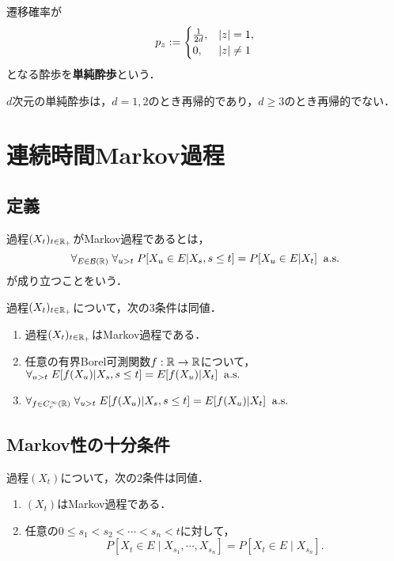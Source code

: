 \documentclass[uplatex,dvipdfmx]{jsreport}
\begin{document}
\begin{definition}
    遷移確率が
    \[p_z:=\begin{cases}
        \frac{1}{2d},&\lvert z\rvert=1,\\
        0,&\lvert z\rvert\ne1
    \end{cases}\]
    となる酔歩を\textbf{単純酔歩}という．
\end{definition}

\begin{theorem}[Polya]
    $d$次元の単純酔歩は，$d=1,2$のとき再帰的であり，$d\ge3$のとき再帰的でない．
\end{theorem}



\section{連続時間Markov過程}

\subsection{定義}

\begin{definition}
    過程$(X_t)_{t\in\mathbb{R}_+}$がMarkov過程であるとは，
    \[\forall_{E\in\mathcal{B}(\mathbb{R})}\;\forall_{u>t}\;P[X_u\in E|X_s,s\le t]=P[X_u\in E|X_t]\;\;\mathrm{a.s.}\]
    が成り立つことをいう．
\end{definition}

\begin{lemma}
    過程$(X_t)_{t\in\mathbb{R}_+}$について，次の3条件は同値．
    \begin{enumerate}
        \item 過程$(X_t)_{t\in\mathbb{R}_+}$はMarkov過程である．
        \item 任意の有界Borel可測関数$f:\mathbb{R}\to\mathbb{R}$について，$\forall_{u>t}\;E[f(X_u)|X_s,s\le t]=E[f(X_u)|X_t]\;\;\mathrm{a.s.}$
        \item $\forall_{f\in C_c^\infty(\mathbb{R})}\;\forall_{u>t}\;E[f(X_u)|X_s,s\le t]=E[f(X_u)|X_t]\;\;\mathrm{a.s.}$
    \end{enumerate}
\end{lemma}

\subsection{Markov性の十分条件}

\begin{theorem}
    過程$(X_t)$について，次の2条件は同値．
    \begin{enumerate}
        \item $(X_t)$はMarkov過程である．
        \item 任意の$0\le s_1<s_2<\cdots<s_n<t$に対して，
        \[P[X_t\in E\mid X_{s_1},\cdots,X_{s_n}]=P[X_t\in E\mid X_{s_n}].\]
    \end{enumerate}
\end{theorem}
\end{document}
